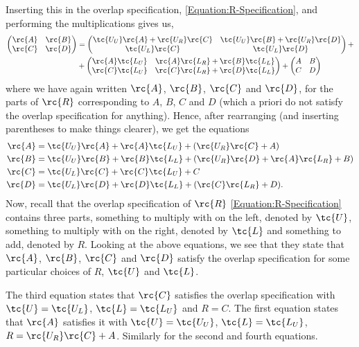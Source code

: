 Inserting this in the overlap specification, \eqref{Equation:R-Specification}, and performing the multiplications gives us,
\begin{align*}
  \begin{pmatrix}
    \rc{A} & \rc{B} \\
    \rc{C} & \rc{D}
  \end{pmatrix} &= 
  \begin{pmatrix}
    \tc{U_U}\rc{A} + \rc{U_R}\rc{C}  &  \tc{U_U}\rc{B} + \rc{U_R}\rc{D} \\
    \tc{U_L}\rc{C}                   &  \tc{U_L}\rc{D}
  \end{pmatrix}
  +\\&+
  \begin{pmatrix}
    \rc{A}\tc{L_U}        &   \rc{A}\rc{L_R} + \rc{B}\tc{L_L}\\
    \rc{C}\tc{L_U}        &   \rc{C}\rc{L_R} + \rc{D}\tc{L_L}
  \end{pmatrix}
  +
  \begin{pmatrix}
    A & B \\
    C & D
  \end{pmatrix}
\end{align*}
where we have again written $\rc{A}$, $\rc{B}$, $\rc{C}$ and $\rc{D}$, for the parts of $\rc{R}$ corresponding to $A$, $B$, $C$ and $D$ (which a priori do not satisfy the overlap specification for anything).
Hence, after rearranging (and inserting parentheses to make things clearer), we get the equations
\begin{align*}
  \rc{A} &= \tc{U_U}\rc{A} + \rc{A}\tc{L_U} + (\rc{U_R}\rc{C} + A) \\
  \rc{B} &= \tc{U_U}\rc{B} + \rc{B}\tc{L_L} + (\rc{U_R}\rc{D} + \rc{A}\rc{L_R} + B) \\
  \rc{C} &= \tc{U_L}\rc{C} + \rc{C}\tc{L_U} + C\\
  \rc{D} &= \tc{U_L}\rc{D} + \rc{D}\tc{L_L} + (\rc{C}\rc{L_R} +  D).
\end{align*}
Now, recall that the overlap specification of $\rc{R}$ \eqref{Equation:R-Specification} contains three parts, something to multiply with on the left, denoted by $\tc{U}$, something to multiply with on the right, denoted by $\tc{L}$ and something to add, denoted by $R$. Looking at the above equations, we see that they state that $\rc{A}$, $\rc{B}$, $\rc{C}$ and $\rc{D}$ satisfy the  overlap specification for some particular choices of $R$, $\tc{U}$ and $\tc{L}$.

The third equation states that  $\rc{C}$ satisfies the overlap specification with $\tc{U} = \tc{U_L}$, $\tc{L} = \tc{L_U}$ and $R = C$. The first equation
states that $\rc{A}$ satisfies it with $\tc{U} = \tc{U_U}$, $\tc{L} = \tc{L_U}$, $R = \rc{U_R}\rc{C} + A$. Similarly for the second and fourth equations.

